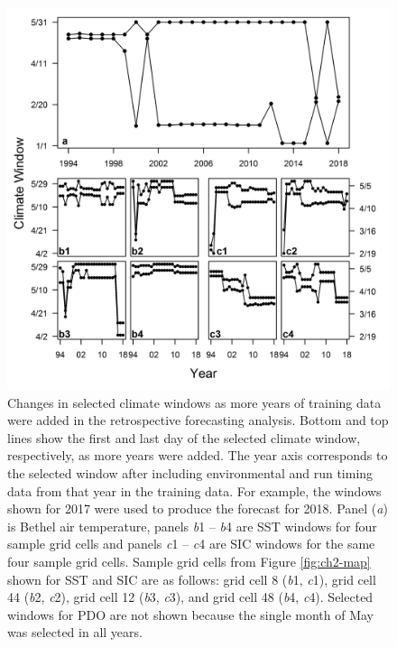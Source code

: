 \documentclass[12pt,]{book}
\theoremstyle{definition}
\theoremstyle{definition}
\theoremstyle{definition}
\theoremstyle{remark}
\begin{document}
\begin{figure}
  \centering
  \includegraphics{img/Ch2/window-changes.png}
  \caption{Changes in selected climate windows as more years of training data were added in the retrospective forecasting analysis. Bottom and top lines show the first and last day of the selected climate window, respectively, as more years were added. The year axis corresponds to the selected window after including environmental and run timing data from that year in the training data. For example, the windows shown for 2017 were used to produce the forecast for 2018. Panel (\textit{a}) is Bethel air temperature, panels \textit{b}1 -- \textit{b}4 are SST windows for four sample grid cells and panels \textit{c}1 -- \textit{c}4 are SIC windows for the same four sample grid cells. Sample grid cells from Figure \ref{fig:ch2-map} shown for SST and SIC are as follows: grid cell 8 (\textit{b}1, \textit{c}1), grid cell 44 (\textit{b}2, \textit{c}2), grid cell 12 (\textit{b}3, \textit{c}3), and grid cell 48 (\textit{b}4, \textit{c}4). Selected windows for PDO are not shown because the single month of May was selected in all years.}
  \label{fig:window-changes}
\end{figure}

\clearpage
\end{document}
